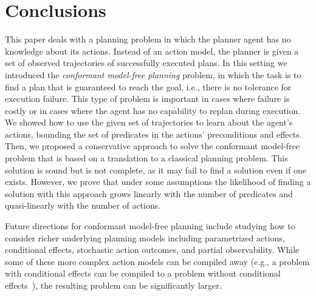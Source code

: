 \documentclass{article}
\begin{document}
	
	
	\section{Conclusions}
	This paper deals with a planning problem in which the planner agent has no knowledge about its actions. Instead of an action model, the planner is given a set of observed trajectories of successfully executed plans. 	In this setting we introduced the {\em conformant model-free planning} problem, in which the task is to find a plan that is guaranteed to reach the goal, i.e., there is no tolerance for execution failure. This type of problem is important in cases where failure is costly or in cases where the agent has no capability to replan during execution. 
	We showed how to use the given set of trajectories to learn
	about the agent's actions, bounding the set of predicates in the actions'  preconditions and effects. Then, we proposed a conservative approach to solve the conformant model-free problem that is based on a translation to a classical planning problem. This solution is sound but is not complete, as it may fail to find a solution even if one exists. However, we prove that under some assumptions the likelihood of finding a solution with this approach grows linearly with the number of predicates and quasi-linearly with the number of actions. 
	
	
	Future directions for conformant model-free planning include studying how to consider richer underlying planning models including parametrized actions, conditional effects, stochastic action outcomes, and partial observability. While some of these more complex action models can be compiled away (e.g., a problem with conditional effects can be compiled to a problem without conditional effects~\cite{nebel2000compilability}), the resulting problem can be significantly larger.   
	
	
	
	
	
	
\end{document}
